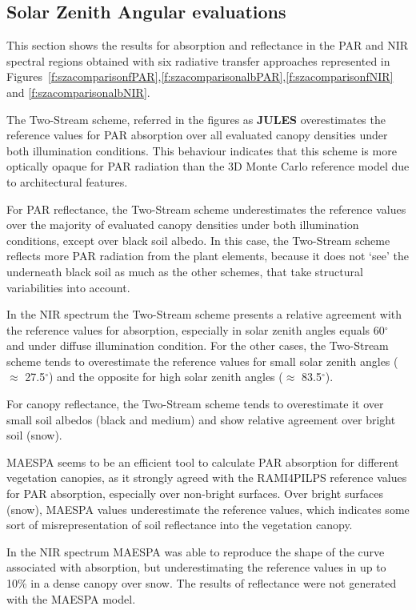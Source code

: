 \documentclass[a4paper,11pt]{report}
\begin{document}
\subsection{Solar Zenith Angular evaluations}
This section shows the results for absorption and reflectance in the PAR and NIR spectral regions obtained with six radiative transfer approaches represented in Figures~\ref{f:szacomparisonfPAR},\ref{f:szacomparisonalbPAR},\ref{f:szacomparisonfNIR} and \ref{f:szacomparisonalbNIR}.

The Two-Stream scheme, referred in the figures as \textbf{JULES} overestimates the reference values for PAR absorption over all evaluated canopy densities under both illumination conditions. This behaviour indicates that this scheme is more optically opaque for PAR radiation than the 3D Monte Carlo reference model due to architectural features. 

For PAR reflectance, the Two-Stream scheme underestimates the reference values over the majority of evaluated canopy densities under both illumination conditions, except over black soil albedo. In this case, the Two-Stream scheme reflects more PAR radiation from the plant elements, because it does not `see' the underneath  black soil as much as the other schemes, that take structural variabilities into account.

In the NIR spectrum the Two-Stream scheme presents a relative agreement with the reference values for absorption, especially in solar zenith angles equals 60$^{\circ}$ and under diffuse illumination condition. For the other cases, the Two-Stream scheme tends to overestimate the reference values for small solar zenith angles ($\approx$ 27.5$^{\circ}$) and the opposite for high solar zenith angles ($\approx$ 83.5$^{\circ}$).

For canopy reflectance, the Two-Stream scheme tends to overestimate it over small soil albedos (black and medium) and show relative agreement over bright soil (snow).

MAESPA seems to be an efficient tool to calculate PAR absorption for different vegetation canopies, as it strongly agreed with the RAMI4PILPS reference values for PAR absorption, especially over non-bright surfaces. Over bright surfaces (snow), MAESPA values underestimate the reference values, which indicates some sort of misrepresentation of soil reflectance into the vegetation canopy.

In the NIR spectrum MAESPA was able to reproduce the shape of the curve associated with absorption, but underestimating the reference values in up to 10\% in a dense canopy over snow. The results of reflectance were not generated with the MAESPA model.
\end{document}
